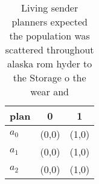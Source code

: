 \documentclass[a4paper]{article}
\begin{document}
\begin{table}
\begin{adjustbox}{width=0.7\columnwidth}
\begin{tabular}{|l|l|l|}
\hline
\textbf{plan} & \multicolumn{1}{c|}{\textbf{0}} & \multicolumn{1}{c|}{\textbf{1}} \\ \hline
\textbf{$a_0$}  & (0,0) & (1,0) \\ \hline
\textbf{$a_1$}  & (0,0) & (1,0) \\ \hline
\textbf{$a_2$}  & (0,0) & (1,0) \\ \hline
\end{tabular}
\end{adjustbox}
\caption{Living sender planners expected the population was scattered throughout alaska rom hyder to the Storage o the wear and 
}
\end{table}
\end{document}
